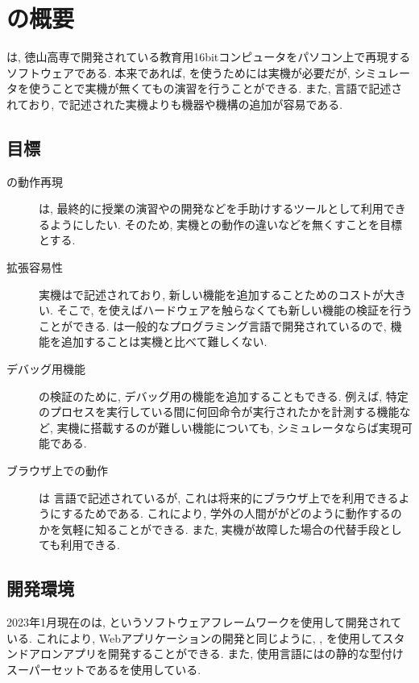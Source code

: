 \chapter{\tacsim の概要}

\tacsim は, 徳山高専で開発されている教育用16bitコンピュータ\tac をパソコン上で再現するソフトウェアである. 本来であれば, \tac を使うためには実機が必要だが, シミュレータを使うことで実機が無くても\tac の演習を行うことができる. また, \ts 言語で記述されており, \vhdl で記述された実機よりも機器や機構の追加が容易である.

\section{目標}

\begin{description}
    \item[ \tac の動作再現 ] \tacsim は, 最終的に授業の演習や\tacos の開発などを手助けするツールとして利用できるようにしたい. そのため, 実機との動作の違いなどを無くすことを目標とする.
    \item[ 拡張容易性 ] \tac 実機は\vhdl で記述されており, 新しい機能を追加することためのコストが大きい. そこで, \tacsim を使えばハードウェアを触らなくても新しい機能の検証を行うことができる. \tacsim は一般的なプログラミング言語で開発されているので, 機能を追加することは\tac 実機と比べて難しくない.
    \item[ デバッグ用機能 ] \tac の検証のために, デバッグ用の機能を追加することもできる. 例えば, 特定のプロセスを実行している間に何回命令が実行されたかを計測する機能など, 実機に搭載するのが難しい機能についても, シミュレータならば実現可能である. 
    \item[ ブラウザ上での動作 ] \tacsim は \ts 言語で記述されているが, これは将来的にブラウザ上で\tac を利用できるようにするためである. これにより, 学外の人間が\tac がどのように動作するのかを気軽に知ることができる. また, 実機が故障した場合の代替手段としても利用できる.
\end{description}

\section{開発環境}

2023年1月現在の\tacsim は, \electron というソフトウェアフレームワークを使用して開発されている. これにより, Webアプリケーションの開発と同じように\html , \css , \js を使用してスタンドアロンアプリを開発することができる. また, 使用言語には\js の静的な型付けスーパーセットである\ts を使用している.

